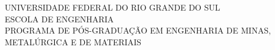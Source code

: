 \documentclass[
	12pt,				%
	openright,			%
	oneside,			%
	a4paper,			%
	english,			%
	french,				%
	spanish,			%
	brazil				%
	]{abntex2}
\begin{document}

\frenchspacing 

\begin{capa}
        \begin{center}
                \begin{DoubleSpace}
                \MakeUppercase{UNIVERSIDADE FEDERAL DO RIO GRANDE DO SUL } \\
                 \MakeUppercase{Escola de Engenharia} \\
                \MakeUppercase{Programa de Pós-Graduação em Engenharia de Minas, Metalúrgica e de Materiais} \\
                \end{DoubleSpace}
                \vspace{5cm}
				\MakeUppercase{\imprimirautor}  \\
            
                        				
				\vspace{5cm}
             \textbf{{\large\MakeUppercase{\imprimirtitulo}}} \\
			 \textbf{{\large \MakeUppercase{\imprimirsubtitulo}}} \\
				\vfill
        {\large{\imprimirlocal \\ \imprimirdata }}
        \end{center}
\end{capa}   


\end{document}
